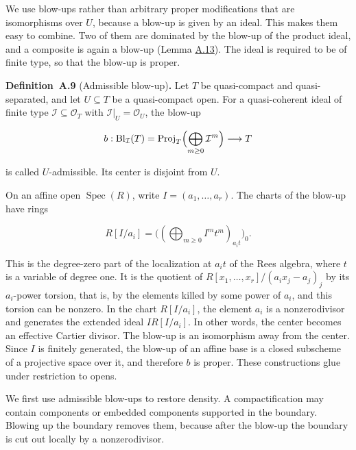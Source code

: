 \documentclass[11pt]{article}
\newenvironment{bpstatement}[2]{\par\addvspace{0.6\baselineskip}\noindent\textbf{#1}#2\textbf{.}\enspace\ignorespaces}
  {\par\addvspace{0.4\baselineskip}}
\begin{document}
We use blow-ups rather than arbitrary proper modifications that are isomorphisms over \(U\), because a blow-up is given by an ideal. This makes them easy to combine. Two of them are dominated by the blow-up of the product ideal, and a composite is again a blow-up (Lemma \hyperref[bp35]{A.13}). The ideal is required to be of finite type, so that the blow-up is proper.

\label{bp27}%
\begin{bpstatement}{Definition~A.9}{ (Admissible blow-up)}
Let \(T\) be quasi-compact and quasi-separated, and let \(U\subseteq T\) be a quasi-compact open. For a quasi-coherent ideal of finite type \(\mathcal I\subseteq\mathcal O_T\) with \(\mathcal I|_U=\mathcal O_U\), the blow-up

\[
b:\operatorname{Bl}_{\mathcal I}(T)=
\operatorname{Proj}_T\Bigl(\bigoplus_{m\geq0}\mathcal I^m\Bigr)
\longrightarrow T
\]

is called \(U\)-admissible. Its center is disjoint from \(U\).
\end{bpstatement}

\label{bp28}%
On an affine open \(\operatorname{Spec}(R)\), write \(I=(a_1,\ldots,a_r)\). The charts of the blow-up have rings

\[
R[I/a_i]=\bigl((\bigoplus_{m\geq0}I^mt^m)_{a_it}\bigr)_0.
\]

This is the degree-zero part of the localization at \(a_it\) of the Rees algebra, where \(t\) is a variable of degree one. It is the quotient of \(R[x_1,\ldots,x_r]/(a_ix_j-a_j)_j\) by its \(a_i\)-power torsion, that is, by the elements killed by some power of \(a_i\), and this torsion can be nonzero. In the chart \(R[I/a_i]\), the element \(a_i\) is a nonzerodivisor and generates the extended ideal \(IR[I/a_i]\). In other words, the center becomes an effective Cartier divisor. The blow-up is an isomorphism away from the center. Since \(I\) is finitely generated, the blow-up of an affine base is a closed subscheme of a projective space over it, and therefore \(b\) is proper. These constructions glue under restriction to opens.

We first use admissible blow-ups to restore density. A compactification may contain components or embedded components supported in the boundary. Blowing up the boundary removes them, because after the blow-up the boundary is cut out locally by a nonzerodivisor.
\end{document}
